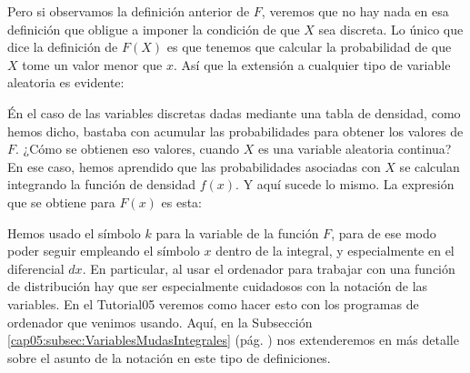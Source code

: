 Pero si observamos la definición anterior de $F$, veremos que no hay nada en esa definición que obligue a imponer la condición de que $X$ sea discreta. Lo único que dice la definición de $F(X)$ es que tenemos que calcular la probabilidad de que $X$ tome un valor menor que $x$. Así que la extensión a cualquier tipo de variable aleatoria es evidente:
    \begin{center}
    \end{center}
Én el caso de las variables discretas dadas mediante una tabla de densidad, como hemos dicho, bastaba con acumular las probabilidades para obtener los valores de $F$. ¿Cómo se obtienen eso valores, cuando $X$ es una variable aleatoria continua? En ese caso, hemos aprendido que las probabilidades asociadas con $X$ se calculan integrando la función de densidad $f(x)$. Y aquí sucede lo mismo. La expresión que se obtiene para $F(x)$ es esta:
    \begin{center}
    \end{center}
Hemos usado el símbolo $k$ para la variable de la función $F$, para de ese modo poder seguir empleando el símbolo $x$ dentro de la integral, y especialmente en el diferencial $dx$. En particular, al usar el ordenador para trabajar con una función de distribución {\sf hay que ser especialmente cuidadosos con la notación de las variables}. En el Tutorial05 veremos como hacer esto con los programas de ordenador que venimos usando. Aquí, en la Subsección \ref{cap05:subsec:VariablesMudasIntegrales} (pág. \pageref{cap05:subsec:VariablesMudasIntegrales}) nos extenderemos en más detalle sobre el asunto de la notación en este tipo de definiciones.

